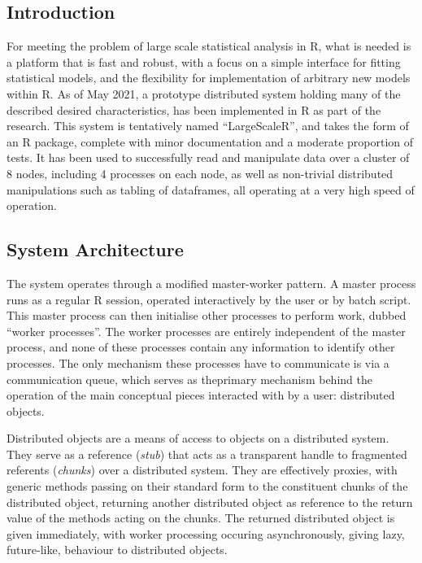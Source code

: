 \subsection{Introduction}

For meeting the problem of large scale statistical analysis in R, what is needed is a platform that is fast and robust, with a focus on a simple interface for fitting statistical models, and the flexibility for implementation of arbitrary new models within R.
As of May 2021, a prototype distributed system holding many of the described desired characteristics, has been implemented in R as part of the research.
This system is tentatively named ``LargeScaleR'', and takes the form of an R package, complete with minor documentation and a moderate proportion of tests.
It has been used to successfully read and manipulate data over a cluster of 8 nodes, including 4 processes on each node, as well as non-trivial distributed manipulations such as tabling of dataframes, all operating at a very high speed of operation.

\subsection{System Architecture}\label{sec:sys-imp}

The system operates through a modified master-worker pattern.
A master process runs as a regular R session, operated interactively by the user or by batch script.
This master process can then initialise other processes to perform work, dubbed ``worker processes''.
The worker processes are entirely independent of the master process, and none of these processes contain any information to identify other processes.
The only mechanism these processes have to communicate is via a communication queue, which serves as theprimary mechanism behind the operation of the main conceptual pieces interacted with by a user: distributed objects.

Distributed objects are a means of access to objects on a distributed system.
They serve as a reference (\textit{stub}) that acts as a transparent handle to fragmented referents (\textit{chunks}) over a distributed system.
They are effectively proxies, with generic methods passing on their standard form to the constituent chunks of the distributed object, returning another distributed object as reference to the return value of the methods acting on the chunks.
The returned distributed object is given immediately, with worker processing occuring asynchronously, giving lazy, future-like, behaviour to distributed objects.

